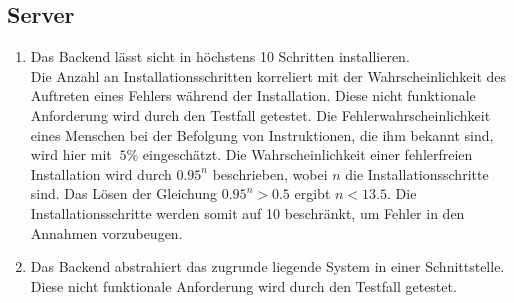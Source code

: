 \subsection*{Server}

\begin{samepage}
    \begin{enumerate}[label=\textbf{/NFP\arabic*0/}, align=left, start=3]
        \item \label{/NFP30/} Das \Gls{Backend} lässt sicht in höchstens 10 Schritten installieren. \\
              Die Anzahl an Installationsschritten korreliert mit der Wahrscheinlichkeit des Auftreten eines Fehlers während der Installation. Diese nicht funktionale Anforderung wird durch den Testfall  getestet.
              Die Fehlerwahrscheinlichkeit eines Menschen bei der Befolgung von Instruktionen, die ihm bekannt sind, wird hier mit $~5\%$ eingeschätzt.
              Die Wahrscheinlichkeit einer fehlerfreien Installation wird durch $0.95^n$ beschrieben, wobei $n$ die Installationsschritte sind.
              Das Lösen der Gleichung $0.95^n > 0.5$ ergibt $n < 13.5$. Die Installationsschritte werden somit auf 10 beschränkt, um Fehler in den Annahmen vorzubeugen.
        \item \label{/NFP40/} Das \Gls{Backend} abstrahiert das zugrunde liegende \Gls{System} in einer \Gls{Schnittstelle}. Diese nicht funktionale Anforderung wird durch den Testfall  getestet.
    \end{enumerate}
\end{samepage}